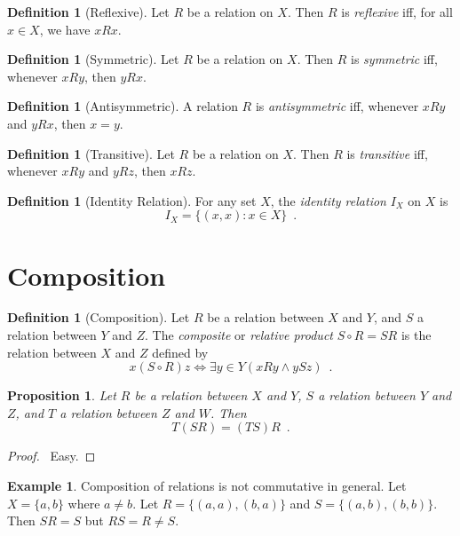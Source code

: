 \documentclass{report}
\let\qed\relax
\newtheorem{prop}[ax]{Proposition}
\theoremstyle{definition}
\newtheorem{df}[ax]{Definition}
\newtheorem{ex}[ax]{Example}
\begin{document}
\begin{df}[Reflexive]
Let $R$ be a relation on $X$. Then $R$ is \emph{reflexive} iff, for all $x \in X$, we have $xRx$.
\end{df}

\begin{df}[Symmetric]
Let $R$ be a relation on $X$. Then $R$ is \emph{symmetric} iff, whenever $xRy$, then $yRx$.
\end{df}

\begin{df}[Antisymmetric]
A relation $R$ is \emph{antisymmetric} iff, whenever $xRy$ and $yRx$, then $x = y$.
\end{df}

\begin{df}[Transitive]
Let $R$ be a relation on $X$. Then $R$ is \emph{transitive} iff, whenever $xRy$ and $yRz$, then $xRz$.
\end{df}

\begin{df}[Identity Relation]
For any set $X$, the \emph{identity relation} $I_X$ on $X$ is
\[ I_X = \{(x,x) : x \in X \} \enspace . \]
\end{df}

\section{Composition}

\begin{df}[Composition]
Let $R$ be a relation between $X$ and $Y$, and $S$ a relation between $Y$ and $Z$. The \emph{composite} or \emph{relative product} $S \circ R = SR$ is the relation between $X$ and $Z$ defined by
\[ x (S \circ R) z \Leftrightarrow \exists y \in Y (xRy \wedge ySz) \enspace . \]
\end{df}

\begin{prop}
Let $R$ be a relation between $X$ and $Y$, $S$ a relation between $Y$ and $Z$, and $T$ a relation between $Z$ and $W$. Then
\[ T(SR) = (TS)R \enspace . \]
\end{prop}

\begin{proof}
\pf\ Easy. \qed
\end{proof}

\begin{ex}
\label{ex:composition_not_commutative}
Composition of relations is not commutative in general. Let $X = \{a,b\}$ where $a \neq b$. Let $R = \{(a,a),(b,a)\}$ and $S = \{(a,b),(b,b)\}$. Then $SR = S$ but $RS = R \neq S$.
\end{ex}
\end{document}
